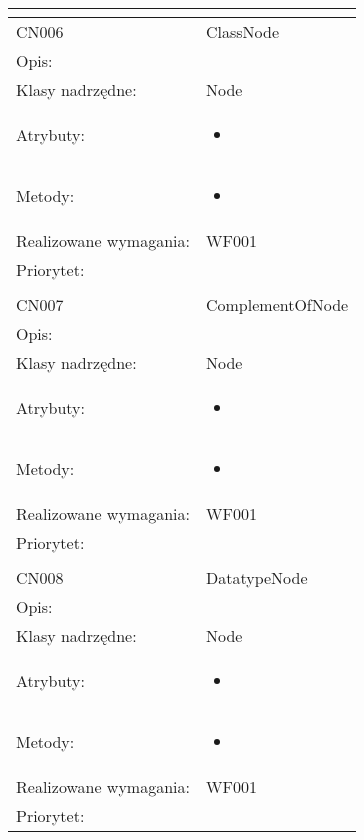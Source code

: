 \documentclass[a4paper,10pt]{article}
\begin{document}
\begin{center}
\begin{tabular}{|m{3cm}|m{9cm}|}
\multicolumn{2}{c}{} \\
 \hline

CN006 & ClassNode \\ \hline
Opis: &     \\ \hline
Klasy nadrzędne: & Node     \\ \hline
Atrybuty: & \begin{itemize}
 \item 
\end{itemize}
 \\ \hline
Metody: & \begin{itemize}
 \item 
\end{itemize}
  \\ \hline
Realizowane wymagania: & WF001 \\ \hline
Priorytet: &  \\ \hline

\multicolumn{2}{c}{} \\
 \hline

CN007 & ComplementOfNode \\ \hline
Opis: &     \\ \hline
Klasy nadrzędne: & Node     \\ \hline
Atrybuty: & \begin{itemize}
 \item 
\end{itemize}
 \\ \hline
Metody: & \begin{itemize}
 \item 
\end{itemize}
  \\ \hline
Realizowane wymagania: & WF001 \\ \hline
Priorytet: &  \\ \hline

\multicolumn{2}{c}{} \\
 \hline

CN008 & DatatypeNode \\ \hline
Opis: &     \\ \hline
Klasy nadrzędne: & Node     \\ \hline
Atrybuty: & \begin{itemize}
 \item 
\end{itemize}
 \\ \hline
Metody: & \begin{itemize}
 \item 
\end{itemize}
  \\ \hline
Realizowane wymagania: & WF001 \\ \hline
Priorytet: &  \\ \hline


\end{tabular}
\end{center}
\end{document}
